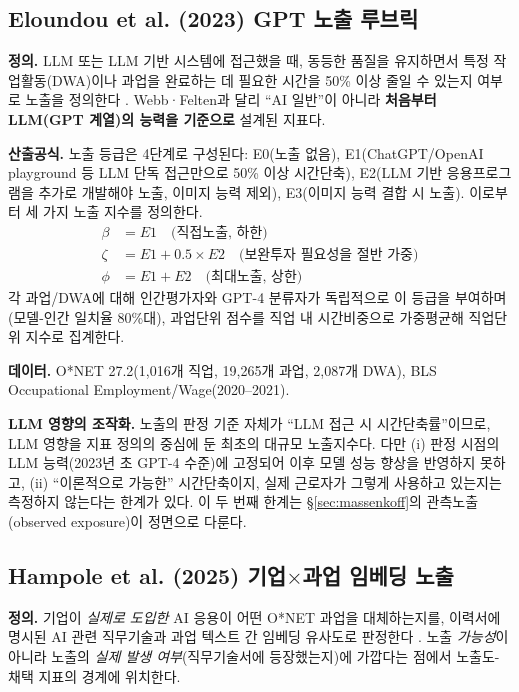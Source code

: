 \documentclass[11pt]{article}
\begin{document}
\subsection{Eloundou et al. (2023) GPT 노출 루브릭}
\label{sec:eloundou}

\textbf{정의.} LLM 또는 LLM 기반 시스템에 접근했을 때, 동등한 품질을 유지하면서 특정 작업활동(DWA)이나 과업을 완료하는 데 필요한 시간을 50\% 이상 줄일 수 있는지 여부로 노출을 정의한다 \parencite{eloundou-2023-gpts-are-gpts-an-early}. Webb·Felten과 달리 ``AI 일반''이 아니라 \textbf{처음부터 LLM(GPT 계열)의 능력을 기준으로} 설계된 지표다.

\textbf{산출공식.} 노출 등급은 4단계로 구성된다: E0(노출 없음), E1(ChatGPT/OpenAI playground 등 LLM 단독 접근만으로 50\% 이상 시간단축), E2(LLM 기반 응용프로그램을 추가로 개발해야 노출, 이미지 능력 제외), E3(이미지 능력 결합 시 노출). 이로부터 세 가지 노출 지수를 정의한다.
\begin{align}
\beta &= E1 \quad \text{(직접노출, 하한)}\label{eq:eloundou-beta}\\
\zeta &= E1 + 0.5\times E2 \quad \text{(보완투자 필요성을 절반 가중)}\label{eq:eloundou-zeta}\\
\phi &= E1 + E2 \quad \text{(최대노출, 상한)}\label{eq:eloundou-phi}
\end{align}
각 과업/DWA에 대해 인간평가자와 GPT-4 분류자가 독립적으로 이 등급을 부여하며(모델-인간 일치율 80\%대), 과업단위 점수를 직업 내 시간비중으로 가중평균해 직업단위 지수로 집계한다.

\textbf{데이터.} O*NET 27.2(1,016개 직업, 19,265개 과업, 2,087개 DWA), BLS Occupational Employment/Wage(2020--2021).

\textbf{LLM 영향의 조작화.} 노출의 판정 기준 자체가 ``LLM 접근 시 시간단축률''이므로, LLM 영향을 지표 정의의 중심에 둔 최초의 대규모 노출지수다. 다만 (i) 판정 시점의 LLM 능력(2023년 초 GPT-4 수준)에 고정되어 이후 모델 성능 향상을 반영하지 못하고, (ii) ``이론적으로 가능한'' 시간단축이지, 실제 근로자가 그렇게 사용하고 있는지는 측정하지 않는다는 한계가 있다. 이 두 번째 한계는 \S\ref{sec:massenkoff}의 관측노출(observed exposure)이 정면으로 다룬다.

\subsection{Hampole et al. (2025) 기업$\times$과업 임베딩 노출}
\label{sec:hampole}

\textbf{정의.} 기업이 \emph{실제로 도입한} AI 응용이 어떤 O*NET 과업을 대체하는지를, 이력서에 명시된 AI 관련 직무기술과 과업 텍스트 간 임베딩 유사도로 판정한다 \parencite{hampole-2025-artificial-intelligence-and-the-labor}. 노출 \emph{가능성}이 아니라 노출의 \emph{실제 발생 여부}(직무기술서에 등장했는지)에 가깝다는 점에서 노출도-채택 지표의 경계에 위치한다.
\end{document}

